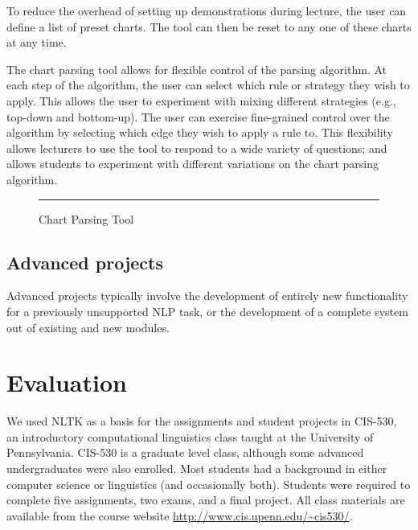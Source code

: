 \documentclass[11pt]{article}
\begin{document}
To reduce the overhead of setting up demonstrations during lecture,
the user can define a list of preset charts.  The tool can then be
reset to any one of these charts at any time.

The chart parsing tool allows for flexible control of the parsing
algorithm.  At each step of the algorithm, the user can select which
rule or strategy they wish to apply.  This allows the user to
experiment with mixing different strategies (e.g., top-down and
bottom-up).  The user can exercise fine-grained control over the
algorithm by selecting which edge they wish to apply a rule to.  This
flexibility allows lecturers to use the tool to respond to a wide
variety of questions; and allows students to experiment with different
variations on the chart parsing algorithm.

\begin{figure}
\centerline{}
\caption{Chart Parsing Tool}\label{fig:chartparse}
\vspace*{2ex}\hrule
\end{figure}

\subsection{Advanced projects}

Advanced projects typically involve the development of entirely new
functionality for a previously unsupported NLP task, or the
development of a complete system out of existing and new modules.


\section{Evaluation}
\label{sec:evaluation}

We used NLTK as a basis for the assignments and student projects in
CIS-530, an introductory computational linguistics class taught at the
University of Pennsylvania.  CIS-530 is a graduate level class,
although some advanced undergraduates were also enrolled.  Most
students had a background in either computer science or linguistics
(and occasionally both).  Students were required to complete five assignments,
two exams, and a final project.  All class materials are available
from the course website \mbox{\url{http://www.cis.upenn.edu/~cis530/}}.
\end{document}
